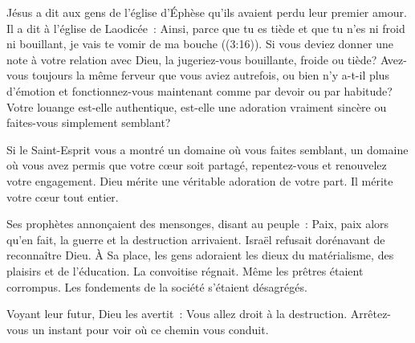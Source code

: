 
Jésus a dit aux gens de l'église d'Éphèse qu'ils avaient perdu
 leur premier amour. Il a dit à l'église de Laodicée~: 
 \og Ainsi, parce que tu es tiède et que tu n'es ni froid ni bouillant,
 je vais te vomir de ma bouche \fg{} 
 ((3:16)).
 Si vous deviez donner une note à votre relation avec Dieu,
 la jugeriez-vous bouillante, froide ou tiède?
 Avez-vous toujours la même ferveur que vous aviez autrefois,
 ou bien n'y a-t-il plus d'émotion et fonctionnez-vous maintenant
 comme par devoir ou par habitude? Votre louange est-elle authentique,
 est-elle une adoration vraiment sincère ou faites-vous simplement semblant? 

Si le Saint-Esprit vous a montré un domaine où vous faites semblant,
 un domaine où vous avez permis que votre cœur soit partagé,
 repentez-vous et renouvelez votre engagement. Dieu mérite une véritable
 adoration de votre part. Il mérite votre cœur tout entier. 

\dvrule






 Ses prophètes annonçaient des mensonges, disant au peuple~: 
 \og Paix, paix \fg{} alors qu'en fait, la guerre et la destruction arrivaient.
 Israël refusait dorénavant de reconnaître Dieu.
 À Sa place, les gens adoraient les dieux du matérialisme, des plaisirs
 et de l'éducation. La convoitise régnait.
 Même les prêtres étaient corrompus.
 Les fondements de la société s'étaient désagrégés. 

Voyant leur futur, Dieu les avertit~:
 \og Vous allez droit à la destruction.
 Arrêtez-vous un instant pour voir où ce chemin vous conduit. \fg{}

